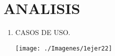 \section{ANALISIS} 

\begin{enumerate}[1.]
	\item CASOS DE USO.\\
	
    


	\begin{center}
	\texttt{[image: ./Imagenes/1ejer22]} 
	\end{center}

\end{enumerate} 
